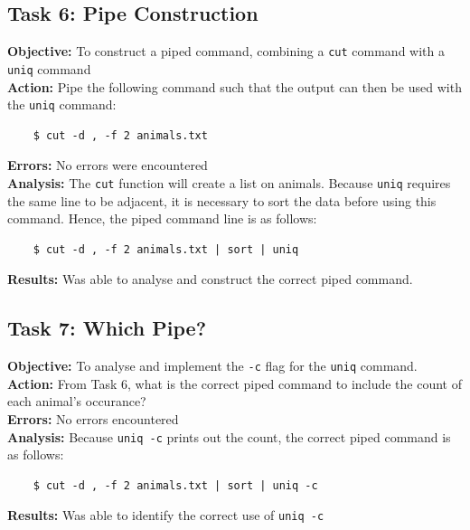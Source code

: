 \documentclass{article}
\begin{document}
\subsection{Task 6: Pipe Construction}
%
\textbf{Objective:} To construct a piped command, combining a \texttt{cut} command with a \texttt{uniq} command\\
\textbf{Action:} Pipe the following command such that the output can then be used with the \texttt{uniq} command:
\begin{verbatim}
    $ cut -d , -f 2 animals.txt
\end{verbatim}
\textbf{Errors:} No errors were encountered\\
\textbf{Analysis:} The \texttt{cut} function will create a list on animals. Because \texttt{uniq} requires the same line to be adjacent, it is necessary to sort the data before using this command. Hence, the piped command line is as follows:
\begin{verbatim}
    $ cut -d , -f 2 animals.txt | sort | uniq
\end{verbatim}
\textbf{Results:} Was able to analyse and construct the correct piped command.
%
\subsection{Task 7: Which Pipe?}
%
\textbf{Objective:} To analyse and implement the \texttt{-c} flag for the \texttt{uniq} command.\\
\textbf{Action:} From Task 6, what is the correct piped command to include the count of each animal's occurance?\\
\textbf{Errors:} No errors encountered\\
\textbf{Analysis:} Because \texttt{uniq -c} prints out the count, the correct piped command is as follows:
\begin{verbatim}
    $ cut -d , -f 2 animals.txt | sort | uniq -c
\end{verbatim}
\textbf{Results:} Was able to identify the correct use of \texttt{uniq -c}
%
\end{document}
